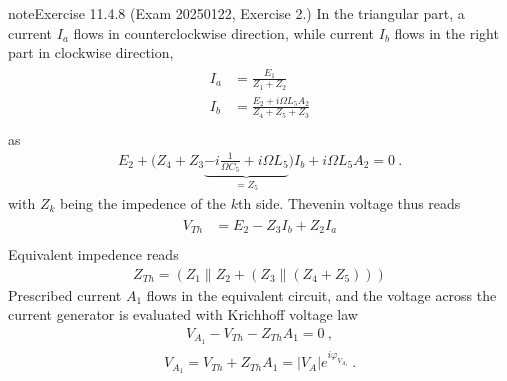 \documentclass[letterpaper,10pt,english]{jupyterBook}
\begin{document}
\begin{sphinxadmonition}{note}{Exercise 11.4.8 (Exam 2025\sphinxhyphen{}01\sphinxhyphen{}22, Exercise 2.)}
\sphinxAtStartPar
In the triangular part, a current \(I_{a}\) flows in counter\sphinxhyphen{}clockwise direction, while current \(I_b\) flows in the right part in clockwise direction,
\begin{equation*}
\begin{split}\begin{aligned}
  I_a & = \frac{E_1}{Z_1 + Z_2} \\
  I_b & = \frac{E_2 + i \Omega L_5 A_2}{Z_4 + Z_5 + Z_3} \\
\end{aligned}\end{split}
\end{equation*}
\sphinxAtStartPar
as
\begin{equation*}
\begin{split}E_2 + \bigg( Z_4 + Z_3 \underbrace{- i \frac{1}{\Omega C_5} + i \Omega L_5}_{=Z_5} \bigg) I_b + i \Omega L_5 A_2 = 0 \ . \end{split}
\end{equation*}
\sphinxAtStartPar
with \(Z_k\) being the impedence of the \(k\)\sphinxhyphen{}th side. Thevenin voltage thus reads
\begin{equation*}
\begin{split}\begin{aligned}
  V_{Th} & = E_2 - Z_3 I_b + Z_2 I_a \\ 
\end{aligned}\end{split}
\end{equation*}
\sphinxAtStartPar
{} Equivalent impedence reads
\begin{equation*}
\begin{split}Z_{Th} = (Z_1 \parallel Z_2 + ( Z_3 \parallel (Z_4 + Z_5)))\end{split}
\end{equation*}
\sphinxAtStartPar
{} Prescribed current \(A_1\) flows in the equivalent circuit, and the voltage across the current generator is evaluated with Krichhoff voltage law
\begin{equation*}
\begin{split}V_{A_1} - V_{Th} - Z_{Th} A_1 = 0 \ ,\end{split}
\end{equation*}\begin{equation*}
\begin{split}V_{A_1} = V_{Th} + Z_{Th} A_1 = |V_A| e^{i \varphi_{V_{A_1}}} \ .\end{split}

\end{equation*}
\end{sphinxadmonition}
\end{document}
